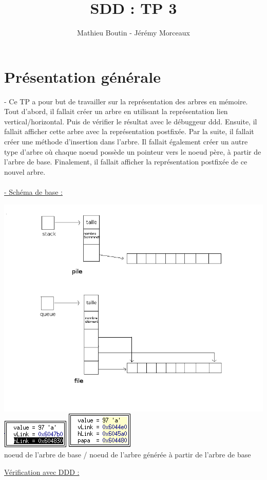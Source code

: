 \documentclass[a4paper]{article}
\title{SDD : TP 3}
\author{Mathieu Boutin - Jérémy Morceaux}
\begin{document}
\maketitle
\section{Présentation générale}
- Ce TP a pour but de travailler sur la représentation des arbres en mémoire. Tout d'abord, il fallait créer un arbre en utilisant la représentation lien vertical/horizontal. Puis de vérifier le résultat avec le débuggeur ddd. Ensuite, il fallait afficher cette arbre avec la représentation postfixée. Par la suite, il fallait créer une méthode d'insertion dans l'arbre. Il fallait également créer un autre type d'arbre où chaque noeud possède un pointeur vers le noeud père, à partir de l'arbre de base. Finalement, il fallait afficher la représentation postfixée de ce nouvel arbre.
\\
\\
\underline{- Schéma de base :}
\begin{center}
\includegraphics[scale=0.4]{Schema_base.png}
\\
\includegraphics[scale=1]{structure_arbre_base.png}
\includegraphics[scale=1]{structure_arbre_modifie.png}
\\
noeud de l'arbre de base / noeud de l'arbre générée à partir de l'arbre de base
\end{center}
\underline{Vérification avec DDD :}
\end{document}
